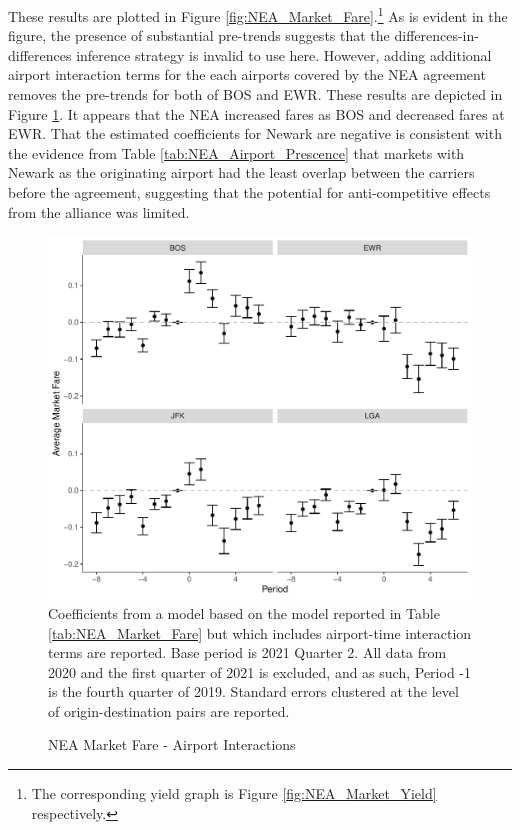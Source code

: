 \documentclass{article}
\begin{document}
    These results are plotted in Figure \ref{fig:NEA_Market_Fare}.\footnote{The corresponding yield graph is Figure \ref{fig:NEA_Market_Yield} respectively.} As is evident in the figure, the presence of substantial pre-trends suggests that the differences-in-differences inference strategy is invalid to use here. However, adding additional airport interaction terms for the each airports covered by the NEA agreement removes the pre-trends for both of BOS and EWR. These results are depicted in Figure \ref{fig:NEA_Airport_Fare_Interaction}. It appears that the NEA increased fares as BOS and decreased fares at EWR. That the estimated coefficients for Newark are negative is consistent with the evidence from Table \ref{tab:NEA_Airport_Prescence} that markets with Newark as the originating airport had the least overlap between the carriers before the agreement, suggesting that the potential for anti-competitive effects from the alliance was limited. 


    \begin{figure}
		\caption{NEA Market Fare - Airport Interactions}
		\label{fig:NEA_Airport_Fare_Interaction}
		\includegraphics[width = \linewidth]{NEA_Airport_Fare_Graph}
		\footnotesize{Coefficients from a model based on the model reported in Table \ref{tab:NEA_Market_Fare} but which includes airport-time interaction terms are reported.   Base period is 2021 Quarter 2. All data from 2020 and the first quarter of 2021 is excluded, and as such, Period -1 is the fourth quarter of 2019. Standard errors clustered at the level of origin-destination pairs are reported. }
	\end{figure}
    
\end{document}
